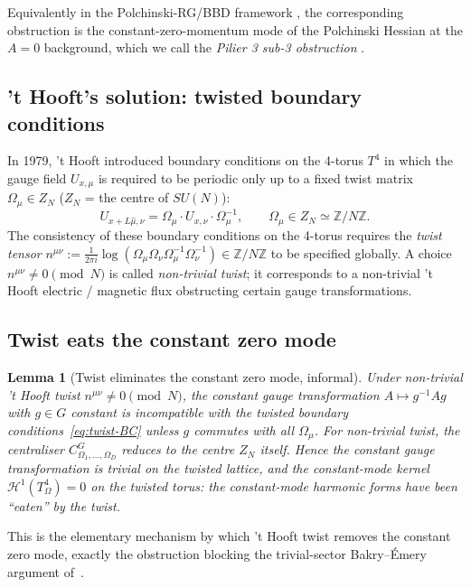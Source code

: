 \documentclass[11pt,a4paper]{amsart}
\newtheorem{lemma}[theorem]{Lemma}
\theoremstyle{definition}
\newcommand{\Z}{\mathbb{Z}}
\begin{document}
Equivalently in the Polchinski-RG/BBD framework
\cite{BauerschmidtDagallier2024}, the corresponding obstruction is
the constant-zero-momentum mode of the Polchinski Hessian at the
$A=0$ background, which we call the \emph{Pilier 3 sub-3 obstruction}
\cite[\S 0]{OpusPolchinskiSubgaps2026}.

\subsection{'t Hooft's solution: twisted boundary conditions}
In 1979, 't Hooft \cite{tHooft1979} introduced boundary conditions on
the 4-torus $T^4$ in which the gauge field $U_{x,\mu}$ is required to
be periodic only up to a fixed twist matrix $\Omega_\mu \in Z_N$
($Z_N$ = the centre of $SU(N)$):
\begin{equation}\label{eq:twist-BC}
U_{x + L\hat\mu, \nu} = \Omega_\mu \cdot U_{x,\nu} \cdot \Omega_\mu^{-1},
\qquad \Omega_\mu \in Z_N \simeq \Z/N\Z.
\end{equation}
The consistency of these boundary conditions on the 4-torus
requires the \emph{twist tensor}
$n^{\mu\nu} := \tfrac{1}{2\pi i}\log(\Omega_\mu \Omega_\nu \Omega_\mu^{-1}
\Omega_\nu^{-1}) \in \Z/N\Z$
to be specified globally. A choice $n^{\mu\nu} \neq 0 \pmod N$ is called
\emph{non-trivial twist}; it corresponds to a non-trivial 't Hooft
electric / magnetic flux \cite{tHooft1979,tHooft1981} obstructing
certain gauge transformations.

\subsection{Twist eats the constant zero mode}
\begin{lemma}[Twist eliminates the constant zero mode, informal]
\label{lem:twist-zero-informal}
Under non-trivial 't Hooft twist $n^{\mu\nu} \neq 0 \pmod N$, the
constant gauge transformation $A \mapsto g^{-1} A g$ with $g\in G$
constant is incompatible with the twisted boundary
conditions~\eqref{eq:twist-BC} unless $g$ commutes with all $\Omega_\mu$.
For non-trivial twist, the centraliser
$C_{\Omega_1,\ldots,\Omega_D}^G$ reduces to the centre $Z_N$ itself.
Hence the constant gauge transformation is trivial on the twisted
lattice, and the constant-mode kernel $\mathcal H^1(T^4_\Omega) = 0$
on the twisted torus: the constant-mode harmonic forms have been
``eaten'' by the twist.
\end{lemma}

This is the elementary mechanism by which 't Hooft twist removes the
constant zero mode, exactly the obstruction blocking the trivial-sector
Bakry--\'Emery argument of~\cite[\S 5]{RemondiereKRFP3_2026}.
\end{document}
